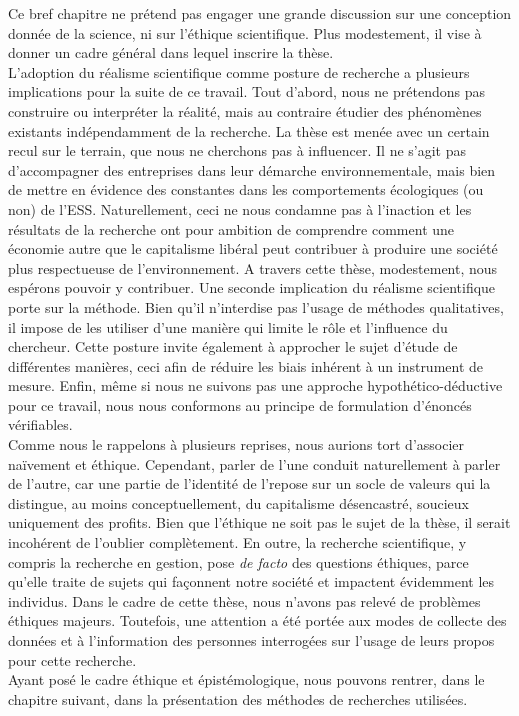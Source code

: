 Ce bref chapitre ne prétend pas engager une grande discussion sur une conception donnée de la science, ni sur l'éthique scientifique. Plus modestement, il vise à donner un cadre général dans lequel inscrire la thèse. \\

L'adoption du réalisme scientifique comme posture de recherche a plusieurs implications pour la suite de ce travail. Tout d'abord, nous ne prétendons pas construire ou interpréter la réalité, mais au contraire étudier des phénomènes existants indépendamment de la recherche. La thèse est menée avec un certain recul sur le terrain, que nous ne cherchons pas à influencer. Il ne s'agit pas d'accompagner des entreprises dans leur démarche environnementale, mais bien de mettre en évidence des constantes dans les comportements écologiques (ou non) de l'ESS. Naturellement, ceci ne nous condamne pas à l'inaction et les résultats de la recherche ont pour ambition  de comprendre comment une économie autre que le capitalisme libéral peut contribuer à produire une société plus respectueuse de l'environnement. A travers cette thèse, modestement, nous espérons pouvoir y contribuer. Une seconde implication du réalisme scientifique porte sur la méthode. Bien qu'il n'interdise pas l'usage de méthodes qualitatives, il impose de les utiliser d'une manière qui limite le rôle et l'influence du chercheur. Cette posture invite également à approcher le sujet d'étude de différentes manières, ceci afin de réduire les biais inhérent à un instrument de mesure. Enfin, même si nous ne suivons pas une approche hypothético-déductive pour ce travail, nous nous conformons au principe de formulation d'énoncés vérifiables. \\

Comme nous le rappelons à plusieurs reprises, nous aurions tort d'associer naïvement \ess et éthique. Cependant, parler de l'une conduit naturellement à parler de l'autre, car une partie de l'identité de l'\ess repose sur un socle de valeurs qui la distingue, au moins conceptuellement, du capitalisme  désencastré, soucieux uniquement des profits. Bien que l'éthique ne soit pas le sujet de la thèse, il serait incohérent de l'oublier complètement. En outre, la recherche scientifique, y compris la recherche en gestion, pose \textit{de facto} des questions éthiques, parce qu'elle traite de sujets qui façonnent notre société et impactent évidemment les individus. Dans le cadre de cette thèse, nous n'avons pas relevé de problèmes éthiques majeurs. Toutefois, une attention a été portée aux modes de collecte des données et à l'information des personnes interrogées sur l'usage de leurs propos pour cette recherche. \\

Ayant posé le cadre éthique et épistémologique, nous pouvons rentrer, dans le chapitre suivant, dans la présentation des méthodes de recherches utilisées.

